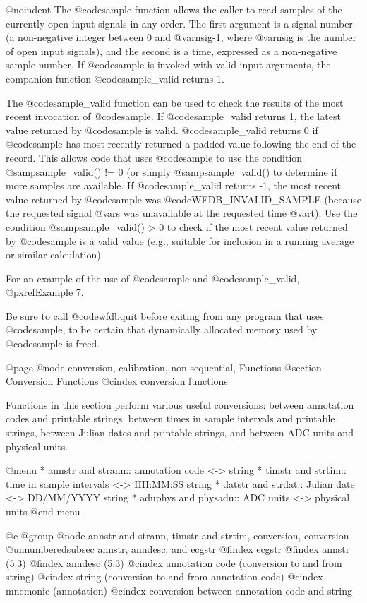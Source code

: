 {{{{{{{{@noindent
The @code{sample} function allows the caller to read samples of the
currently open input signals in any order.  The first argument is a
signal number (a non-negative integer between 0 and @var{nsig}-1,
where @var{nsig} is the number of open input signals), and the second
is a time, expressed as a non-negative sample number. If @code{sample}
is invoked with valid input arguments, the companion function
@code{sample_valid} returns 1.

The @code{sample_valid} function can be used to check the results of the most
recent invocation of @code{sample}.  If @code{sample_valid} returns 1, the
latest value returned by @code{sample} is valid.  @code{sample_valid} returns 0
if @code{sample} has most recently returned a padded value following the end of
the record.  This allows code that uses @code{sample} to use the condition
@samp{sample_valid() != 0} (or simply @samp{sample_valid()} to determine if
more samples are available.  If @code{sample_valid} returns -1, the most recent
value returned by @code{sample} was @code{WFDB_INVALID_SAMPLE} (because the
requested signal @var{s} was unavailable at the requested time @var{t}).  Use
the condition @samp{sample_valid() > 0} to check if the most recent value
returned by @code{sample} is a valid value (e.g., suitable for inclusion in a
running average or similar calculation).

For an example of the use of @code{sample} and @code{sample_valid},
@pxref{Example 7}.

Be sure to call @code{wfdbquit} before exiting from any program that
uses @code{sample}, to be certain that dynamically allocated memory
used by @code{sample} is freed.

@page
@node     conversion, calibration, non-sequential, Functions
@section Conversion Functions
@cindex conversion functions

Functions in this section perform various useful conversions:  between
annotation codes and printable strings, between times in sample intervals
and printable strings, between Julian dates and printable strings, and between
ADC units and physical units.

@menu
* annstr and strann::		annotation code <-> string
* timstr and strtim::		time in sample intervals <-> HH:MM:SS string
* datstr and strdat::		Julian date <-> DD/MM/YYYY string
* aduphys and physadu::		ADC units <-> physical units
@end menu

@c @group
@node     annstr and strann, timstr and strtim, conversion, conversion
@unnumberedsubsec annstr, anndesc, and ecgstr
@findex ecgstr
@findex annstr (5.3)
@findex anndesc (5.3)
@cindex annotation code (conversion to and from string)
@cindex string (conversion to and from annotation code)
@cindex mnemonic (annotation)
@cindex conversion between annotation code and string

}}}}}}}}
